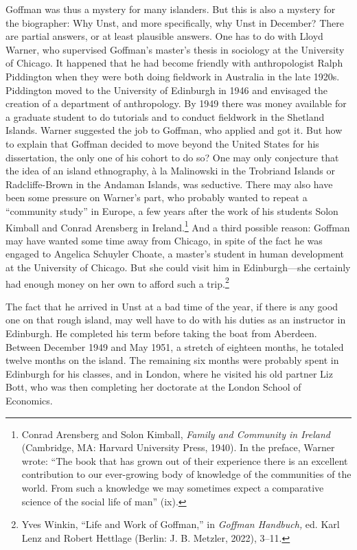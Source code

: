 \documentclass[twoside,symmetric,nobib,justified]{tufte-book}
\begin{document}
\noindent Goffman was thus a mystery for many islanders. But this is also a
mystery for the biographer: Why Unst, and more specifically, why Unst in
December? There are partial answers, or at least plausible answers. One
has to do with Lloyd Warner, who supervised Goffman's master's thesis in
sociology at the University of Chicago. It happened that he had become
friendly with anthropologist Ralph Piddington when they were both doing
fieldwork in Australia in the late 1920s. Piddington moved to the
University of Edinburgh in 1946 and envisaged the creation of a
department of anthropology. By 1949 there was money available for a
graduate student to do tutorials and to conduct fieldwork in the
Shetland Islands. Warner suggested the job to Goffman, who applied and
got it. But how to explain that Goffman decided to move beyond the
United States for his dissertation, the only one of his cohort to do so?
One may only conjecture that the idea of an island ethnography, à la
Malinowski in the Trobriand Islands or Radcliffe-Brown in the Andaman
Islands, was seductive. There may also have been some pressure on
Warner's part, who probably wanted to repeat a ``community study'' in
Europe, a few years after the work of his students Solon Kimball and
Conrad Arensberg in Ireland.\footnote{Conrad Arensberg and Solon
  Kimball, \emph{Family and Community in Ireland} (Cambridge, MA:
  Harvard University Press, 1940). In the preface, Warner wrote: ``The
  book that has grown out of their experience there is an excellent
  contribution to our ever-growing body of knowledge of the communities
  of the world. From such a knowledge we may sometimes expect a
  comparative science of the social life of man'' (ix).} And a third
possible reason: Goffman may have wanted some time away from Chicago, in
spite of the fact he was engaged to Angelica Schuyler Choate, a master's
student in human development at the University of Chicago. But she could
visit him in Edinburgh---she certainly had enough money on her own to
afford such a trip.\footnote{Yves Winkin, ``Life and Work of Goffman,''
  in \emph{Goffman Handbuch,} ed. Karl Lenz and Robert Hettlage (Berlin:
  J. B. Metzler, 2022), 3--11.}

The fact that he arrived in Unst at a bad time of the year, if there is
any good one on that rough island, may well have to do with his duties
as an instructor in Edinburgh. He completed his term before taking the
boat from Aberdeen. Between December 1949 and May 1951, a stretch of
eighteen months, he totaled twelve months on the island. The remaining
six months were probably spent in Edinburgh for his classes, and in
London, where he visited his old partner Liz Bott, who was then
completing her doctorate at the London School of Economics.
\end{document}
